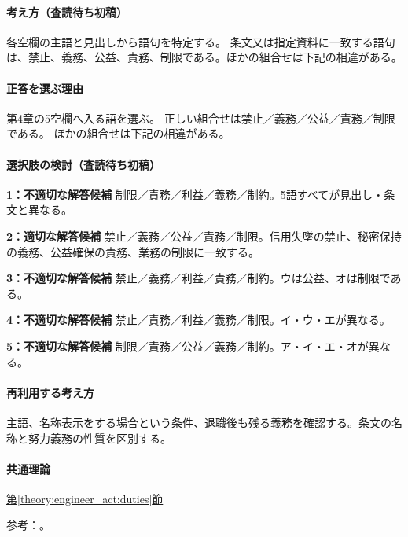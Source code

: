 \paragraph{考え方（査読待ち初稿）} 各空欄の主語と見出しから語句を特定する。 条文又は指定資料に一致する語句は、禁止、義務、公益、責務、制限である。ほかの組合せは下記の相違がある。

\paragraph{正答を選ぶ理由} 第4章の5空欄へ入る語を選ぶ。 正しい組合せは禁止／義務／公益／責務／制限である。 ほかの組合せは下記の相違がある。

\paragraph{選択肢の検討（査読待ち初稿）}\mbox{}\par

\noindent\textbf{1：不適切な解答候補} 制限／責務／利益／義務／制約。5語すべてが見出し・条文と異なる。\par

\noindent\textbf{2：適切な解答候補} 禁止／義務／公益／責務／制限。信用失墜の禁止、秘密保持の義務、公益確保の責務、業務の制限に一致する。\par

\noindent\textbf{3：不適切な解答候補} 禁止／義務／利益／責務／制約。ウは公益、オは制限である。\par

\noindent\textbf{4：不適切な解答候補} 禁止／責務／利益／義務／制限。イ・ウ・エが異なる。\par

\noindent\textbf{5：不適切な解答候補} 制限／責務／公益／義務／制約。ア・イ・エ・オが異なる。\par

\paragraph{再利用する考え方} 主語、名称表示をする場合という条件、退職後も残る義務を確認する。条文の名称と努力義務の性質を区別する。

\paragraph{共通理論} \hyperref[theory:engineer_act:duties]{第\ref*{theory:engineer_act:duties}節}

\par 参考：\cite{engineer_act_current}。

